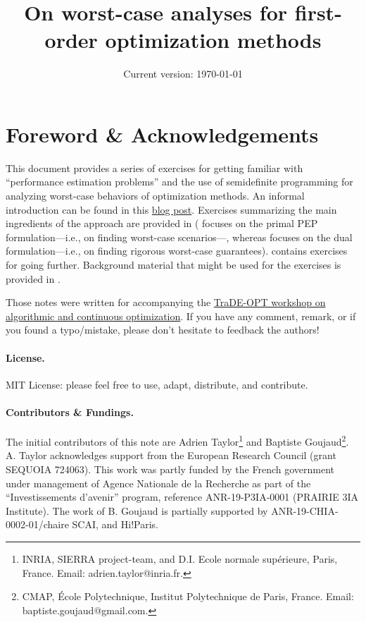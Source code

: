 \documentclass[11pt,a4paper]{article}
\begin{document}
	
	\title{On worst-case analyses for first-order optimization methods}
	\date{Current version: \today}
	\maketitle
	
	\renewcommand*\contentsname{}
	\setcounter{tocdepth}{2} \tableofcontents
	


	\section*{Foreword \& Acknowledgements}
	This document provides a series of exercises for getting familiar with ``performance estimation problems'' and the use of semidefinite programming for analyzing worst-case behaviors of optimization methods. An informal introduction can be found in this \href{https://francisbach.com/computer-aided-analyses/}{blog post}. Exercises summarizing the main ingredients of the approach are provided in  ( focuses on the primal PEP formulation---i.e., on finding worst-case scenarios---, whereas  focuses on the dual formulation---i.e., on finding rigorous worst-case guarantees).  contains exercises for going further. Background material that might be used for the exercises is provided in .
	
	Those notes were written for accompanying the \href{https://trade-opt-itn.eu/workshop.html}{TraDE-OPT workshop on algorithmic and continuous optimization}. If you have any comment, remark, or if you found a typo/mistake, please don't hesitate to feedback the authors!
	
	\paragraph*{License.} MIT License: please feel free to use, adapt, distribute, and contribute.
	
	\paragraph*{Contributors \& Fundings.} The initial contributors of this note are Adrien Taylor\footnote{INRIA, SIERRA project-team, and D.I. Ecole normale sup\'erieure, Paris, France. Email: adrien.taylor@inria.fr.} and Baptiste Goujaud\footnote{CMAP, École Polytechnique, Institut Polytechnique de Paris, France. Email: baptiste.goujaud@gmail.com.}. A. Taylor acknowledges support from the European Research Council (grant SEQUOIA 724063). This work was partly funded by the French government under management of Agence Nationale de la Recherche as part of the ``Investissements d’avenir'' program, reference ANR-19-P3IA-0001 (PRAIRIE 3IA Institute). The work of B. Goujaud is partially supported by ANR-19-CHIA-0002-01/chaire SCAI, and Hi!Paris. 
	
\end{document}
